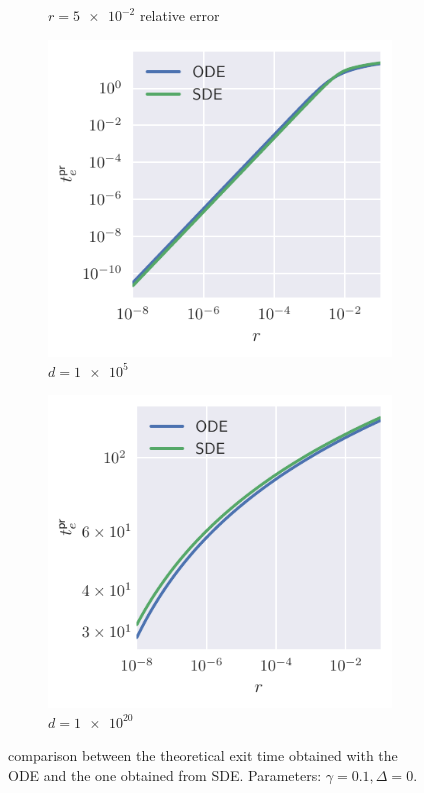 \begin{figure}
\begin{subfigure}{0.495\textwidth}
    \caption{\(r=\num{5e-2}\) relative error}
  \end{subfigure}
  \begin{subfigure}{0.495\textwidth}
    \includegraphics[width=1.\textwidth]{figures/sde/ode_vs_sde_d1e5.pdf}
    \caption{\(d=\num{1e5}\)}
  \end{subfigure}
  \begin{subfigure}{0.495\textwidth}
    \includegraphics[width=1.\textwidth]{figures/sde/ode_vs_sde_d1e20.pdf}
    \caption{\(d=\num{1e20}\)}
  \end{subfigure}
  \caption{
    comparison between the theoretical exit time obtained with the ODE and the one obtained from SDE.
    Parameters: \(\gamma=\num{0.1},\Delta=0\).
  }
  \label{fig:comparison_te_ode_sde}
\end{figure}

